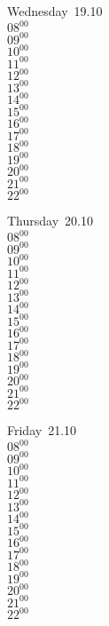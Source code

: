 \documentclass[11pt,a4paper]{book}\usepackage[]{graphicx}\usepackage[]{color}
\begin{document}
\begin{weekdaybox}
  Wednesday~19.10\\
  { 
  \vfill
  $08^{00}$\\
$09^{00}$\\
$10^{00}$\\
$11^{00}$\\
$12^{00}$\\
$13^{00}$\\
$14^{00}$\\
$15^{00}$\\
$16^{00}$\\
$17^{00}$\\
$18^{00}$\\
$19^{00}$\\
$20^{00}$\\
$21^{00}$\\
$22^{00}$\\
  }
\end{weekdaybox}
\clearpage
\begin{headerbox}
\end{headerbox}
\begin{weekdaybox}
  Thursday~20.10\\
  { 
  \vfill
  $08^{00}$\\
$09^{00}$\\
$10^{00}$\\
$11^{00}$\\
$12^{00}$\\
$13^{00}$\\
$14^{00}$\\
$15^{00}$\\
$16^{00}$\\
$17^{00}$\\
$18^{00}$\\
$19^{00}$\\
$20^{00}$\\
$21^{00}$\\
$22^{00}$\\
  }
\end{weekdaybox} 
\begin{weekdaybox}
  Friday~21.10\\
  { 
  \vfill
  $08^{00}$\\
$09^{00}$\\
$10^{00}$\\
$11^{00}$\\
$12^{00}$\\
$13^{00}$\\
$14^{00}$\\
$15^{00}$\\
$16^{00}$\\
$17^{00}$\\
$18^{00}$\\
$19^{00}$\\
$20^{00}$\\
$21^{00}$\\
$22^{00}$\\
  }
\end{weekdaybox}
\end{document}
